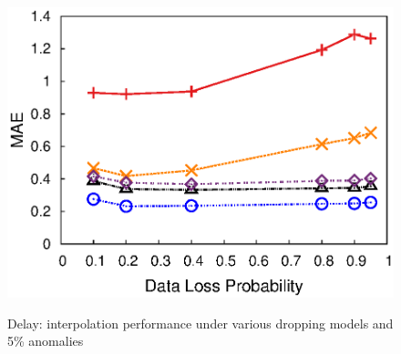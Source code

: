 {\begin{figure}[h!]
{    \includegraphics[width=\figurewidthQ]{fig_lens3/pred.ColRandLoss.srmf_based_pred.tm_ron1.latency..494.12.12.494.r32.period1.org.2d.col.ind.loss0.5.burst1.na0.05.anom1.noise0.thresh-1.eps}
  }
  \vspace{-0.15in}
  \caption{Delay: interpolation performance under various dropping
    models and 5\% anomalies}
  \vspace{-0.1in}
  \label{fig:ron-drop-mode-detection}
\end{figure}
}

